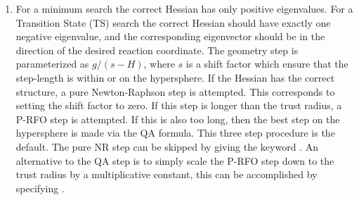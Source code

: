 \begin{enumerate}
\item For a minimum search the correct Hessian has only positive eigenvalues. 
For a Transition State (TS) search the correct Hessian should  have exactly one
negative  eigenvalue, and the corresponding eigenvector should be in the
direction  of the desired reaction coordinate.  The geometry step is
parameterized  as $g/(s-H)$, where $s$ is a shift factor which ensure that the
step-length is  within or on the hypersphere. If the Hessian has the correct
structure, a pure  Newton-Raphson step is attempted. This corresponds to
setting the shift factor  to zero. If this step is longer than the trust
radius, a P-RFO step is attempted.  If this is also too long, then the best
step on the hypersphere is made via  the QA formula.  This three step procedure
is the default. The pure NR step can  be skipped by giving the keyword
. An alternative to the QA step is to  simply scale the P-RFO step
down to the trust radius by a multiplicative  constant, this can be
accomplished by specifying .


\end{enumerate}
